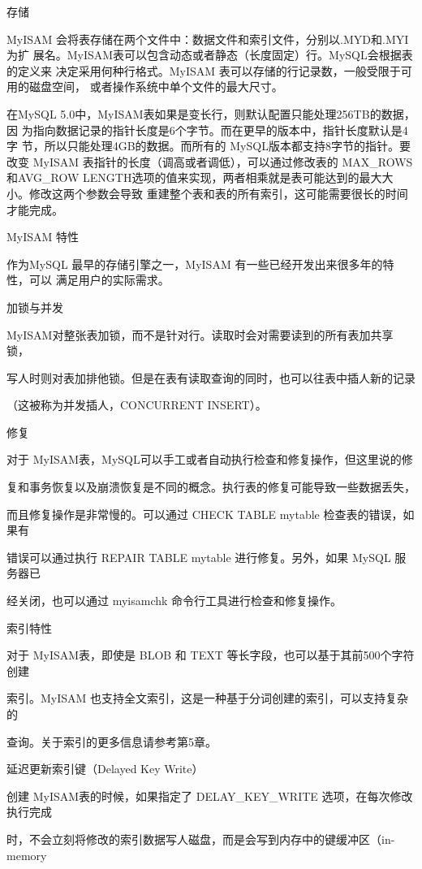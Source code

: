 存储

MyISAM 会将表存储在两个文件中：数据文件和索引文件，分别以.MYD和.MYI为扩
展名。MyISAM表可以包含动态或者静态（长度固定）行。MySQL会根据表的定义来
决定采用何种行格式。MyISAM 表可以存储的行记录数，一般受限于可用的磁盘空间，
或者操作系统中单个文件的最大尺寸。

在MySQL 5.0中，MyISAM表如果是变长行，则默认配置只能处理256TB的数据，因
为指向数据记录的指针长度是6个字节。而在更早的版本中，指针长度默认是4字
节，所以只能处理4GB的数据。而所有的 MySQL版本都支持8字节的指针。要改变
MyISAM 表指针的长度（调高或者调低），可以通过修改表的 MAX\_ROWS 和AVG\_ROW
LENGTH选项的值来实现，两者相乘就是表可能达到的最大大小。修改这两个参数会导致
重建整个表和表的所有索引，这可能需要很长的时间才能完成。

MyISAM 特性

作为MySQL 最早的存储引擎之一，MyISAM 有一些已经开发出来很多年的特性，可以
满足用户的实际需求。

加锁与并发

MyISAM对整张表加锁，而不是针对行。读取时会对需要读到的所有表加共享锁，

写人时则对表加排他锁。但是在表有读取查询的同时，也可以往表中插人新的记录

（这被称为并发插人，CONCURRENT INSERT）。

修复

对于 MyISAM表，MySQL可以手工或者自动执行检查和修复操作，但这里说的修

复和事务恢复以及崩溃恢复是不同的概念。执行表的修复可能导致一些数据丢失，

而且修复操作是非常慢的。可以通过 CHECK TABLE mytable 检查表的错误，如果有

错误可以通过执行 REPAIR TABLE mytable 进行修复。另外，如果 MySQL 服务器已

经关闭，也可以通过 myisamchk 命令行工具进行检查和修复操作。

索引特性

对于 MyISAM表，即使是 BLOB 和 TEXT 等长字段，也可以基于其前500个字符创建

索引。MyISAM 也支持全文索引，这是一种基于分词创建的索引，可以支持复杂的

查询。关于索引的更多信息请参考第5章。

延迟更新索引键（Delayed Key Write）

创建 MyISAM表的时候，如果指定了 DELAY\_KEY\_WRITE 选项，在每次修改执行完成

时，不会立刻将修改的索引数据写人磁盘，而是会写到内存中的键缓冲区（in-memory

